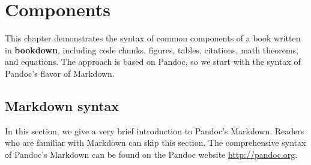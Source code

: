\documentclass[]{krantz}
\begin{document}
\hypertarget{components-1}{%
\chapter{Components}\label{components-1}}

This chapter demonstrates the syntax of common components of a book written in \textbf{bookdown}, including code chunks, figures, tables, citations, math theorems, and equations. The approach is based on Pandoc, so we start with the syntax of Pandoc's flavor of Markdown.

\hypertarget{markdown-syntax-1}{%
\section{Markdown syntax}\label{markdown-syntax-1}}

In this section, we give a very brief introduction to Pandoc's Markdown. Readers who are familiar with Markdown can skip this section. The comprehensive syntax of Pandoc's Markdown can be found on the Pandoc website \url{http://pandoc.org}.



\printindex
\end{document}
